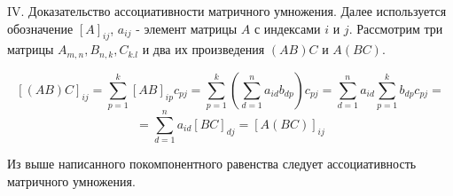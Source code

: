 \documentclass[12pt]{article}
\begin{document}
IV. Доказательство ассоциативности матричного умножения. Далее используется обозначение $[A]_{ij}$, $a_{ij}$ - элемент матрицы $A$ с индексами $i$  и $j$. Рассмотрим три матрицы $A_{m, n}, B_{n, k}, C_{k. l}$ и два их произведения $(AB)C$ и $A(BC)$.

$$[(AB)C]_{ij} = \sum\limits_{p=1}^k[AB]_{ip}c_{pj}= \sum\limits_{p=1}^k\left(\sum\limits_{d=1}^na_{id}b_{dp}\right)c_{pj} = \sum\limits_{d=1}^na_{id}\sum\limits_{p=1}^kb_{dp}c_{pj} =$$
$$=\sum\limits_{d=1}^na_{id}[BC]_{dj}=[A(BC)]_{ij}$$

Из выше написанного покомпонентного равенства следует ассоциативность матричного умножения.
\end{document}

